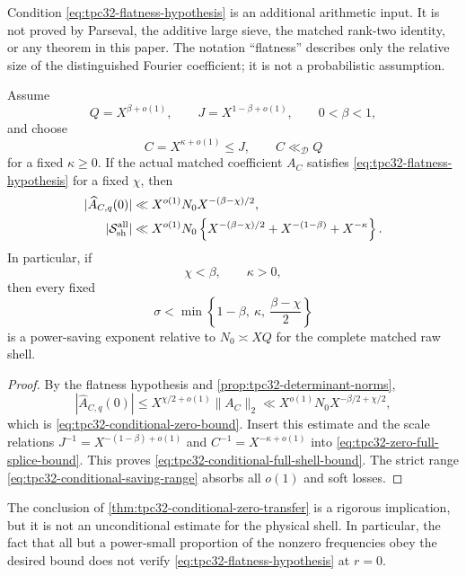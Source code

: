 Condition \eqref{eq:tpc32-flatness-hypothesis} is an additional
arithmetic input.  It is not proved by Parseval, the additive large
sieve, the matched rank-two identity, or any theorem in this paper.
The notation ``flatness'' describes only the relative size of the
distinguished Fourier coefficient; it is not a probabilistic
assumption.

\begin{theorem}
\label{thm:tpc32-conditional-zero-transfer}
Assume
\begin{equation}
 Q=X^{\beta+o(1)},
 \qquad
 J=X^{1-\beta+o(1)},
 \qquad 0<\beta<1,
 \label{eq:tpc32-zero-transfer-scales}
\end{equation}
and choose
\begin{equation}
 C=X^{\kappa+o(1)}\le J,
 \qquad C\ll_{\mathscr D}Q
 \label{eq:tpc32-zero-transfer-content-scale}
\end{equation}
for a fixed $\kappa\ge0$.  If the actual matched coefficient $A_C$
satisfies \eqref{eq:tpc32-flatness-hypothesis} for a fixed $\chi$, then
\begin{align}
 |\widehat A_{C,q}(0)|
 &\ll X^{o(1)}N_0X^{-(\beta-\chi)/2},
 \label{eq:tpc32-conditional-zero-bound}\\
 |\mathcal S_{\rm sh}^{\rm all}|
 &\ll X^{o(1)}N_0
 \left\{
 X^{-(\beta-\chi)/2}
 +X^{-(1-\beta)}
 +X^{-\kappa}
 \right\}.
 \label{eq:tpc32-conditional-full-shell-bound}
\end{align}
In particular, if
\begin{equation}
 \chi<\beta,
 \qquad \kappa>0,
 \label{eq:tpc32-positive-conditional-margins}
\end{equation}
then every fixed
\begin{equation}
 \boxed{
 \sigma<
 \min\left\{
 1-\beta,\ \kappa,\ \frac{\beta-\chi}{2}
 \right\}}
 \label{eq:tpc32-conditional-saving-range}
\end{equation}
is a power-saving exponent relative to $N_0\asymp XQ$ for the complete
matched raw shell.
\end{theorem}

\begin{proof}
By the flatness hypothesis and
\cref{prop:tpc32-determinant-norms},
\[
 |\widehat A_{C,q}(0)|
 \le X^{\chi/2+o(1)}\|A_C\|_2
 \ll X^{o(1)}N_0X^{-\beta/2+\chi/2},
\]
which is \eqref{eq:tpc32-conditional-zero-bound}.  Insert this estimate
and the scale relations
$J^{-1}=X^{-(1-\beta)+o(1)}$ and
$C^{-1}=X^{-\kappa+o(1)}$ into
\eqref{eq:tpc32-zero-full-splice-bound}.  This proves
\eqref{eq:tpc32-conditional-full-shell-bound}.  The strict range
\eqref{eq:tpc32-conditional-saving-range} absorbs all $o(1)$ and soft
losses.
\end{proof}

\begin{remark}
\label{rem:tpc32-flatness-not-proved}
The conclusion of \cref{thm:tpc32-conditional-zero-transfer} is a
rigorous implication, but it is not an unconditional estimate for the
physical shell.  In particular, the fact that all but a power-small
proportion of the nonzero frequencies obey the desired bound does not
verify \eqref{eq:tpc32-flatness-hypothesis} at $r=0$.
\end{remark}
